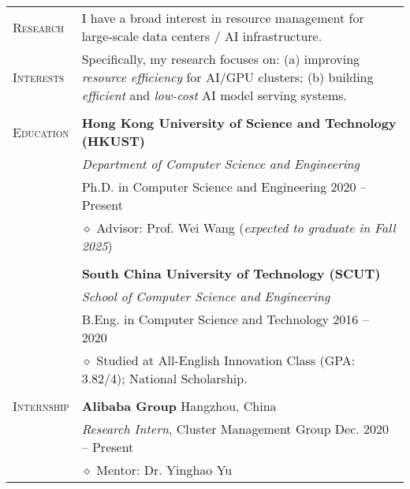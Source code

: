 \documentclass[letterpaper, 10pt]{article}
\begin{document}
\begin{longtable}{p{0.7in}p{6.0in}}


\textsc{Research}
& I have a broad interest in resource management for large-scale data centers / AI infrastructure. \\
\textsc{Interests}
& Specifically, my research focuses on: (a) improving \textit{resource efficiency} for AI/GPU clusters; (b) building \textit{efficient} and \textit{low-cost} AI model serving systems. \\
& \\

{\textsc{Education}}
& \textbf{Hong Kong University of Science and Technology (HKUST)} \\
& \textit{Department of Computer Science and Engineering} \\
& Ph.D. in Computer Science and Engineering \hfill 2020 -- Present \\
& $\diamond$ Advisor: Prof. Wei Wang \hfill (\textit{expected to graduate in Fall 2025}) \\
& \\

& \textbf{South China University of Technology (SCUT)} \\
& \textit{School of Computer Science and Engineering} \\
& B.Eng. in Computer Science and Technology \hfill 2016 -- 2020 \\
& $\diamond$ Studied at All-English Innovation Class (GPA: 3.82/4); National Scholarship. \\
& \\


\nohyphens{\textsc{Internship}}
& {\textbf{Alibaba Group}} \hfill Hangzhou, China \\
& \textit{Research Intern}, Cluster Management Group \hfill Dec. 2020 -- Present \\
& $\diamond$ Mentor: Dr. Yinghao Yu \\


\end{longtable}
\end{document}
